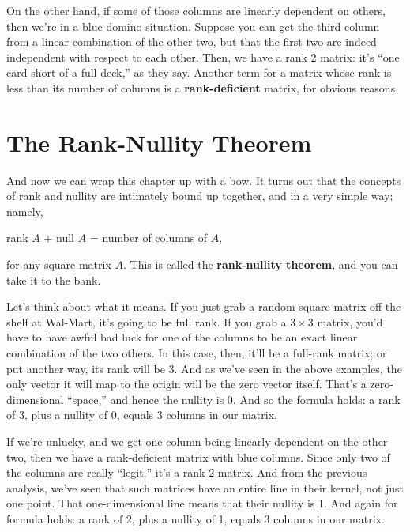 
On the other hand, if some of those columns are linearly dependent on others,
then we're in a blue domino situation. Suppose you can get the third column
from a linear combination of the other two, but that the first two are indeed
independent with respect to each other. Then, we have a rank 2 matrix: it's
``one card short of a full deck,'' as they say. Another term for a matrix whose
rank is less than its number of columns is a \textbf{rank-deficient} matrix,
for obvious reasons.

\section{The Rank-Nullity Theorem}

And now we can wrap this chapter up with a bow. It turns out that the concepts
of rank and nullity are intimately bound up together, and in a very simple way;
namely,

\vspace{-.15in}
\begin{center}
rank $A$ + null $A$ = number of columns of $A$,
\end{center}
\vspace{-.15in}


for any square matrix $A$. This is called the \textbf{rank-nullity theorem},
and you can take it to the bank.

Let's think about what it means. If you just grab a random square matrix off
the shelf at Wal-Mart, it's going to be full rank. If you grab a $3\times 3$
matrix, you'd have to have awful bad luck for one of the columns to be an exact
linear combination of the two others. In this case, then, it'll be a full-rank
matrix; or put another way, its rank will be 3. And as we've seen in the above
examples, the only vector it will map to the origin will be the zero vector
itself. That's a zero-dimensional ``space,'' and hence the nullity is 0. And so
the formula holds: a rank of 3, plus a nullity of 0, equals 3 columns in our
matrix.

If we're unlucky, and we get one column being linearly dependent on the other
two, then we have a rank-deficient matrix with blue columns. Since only two of
the columns are really ``legit,'' it's a rank 2 matrix. And from the previous
analysis, we've seen that such matrices have an entire line in their kernel,
not just one point. That one-dimensional line means that their nullity is 1.
And again for formula holds: a rank of 2, plus a nullity of 1, equals 3 columns
in our matrix.

